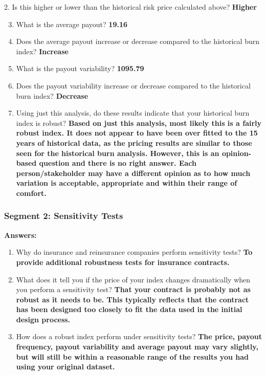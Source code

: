 \documentclass[letterpaper,10pt,english]{sphinxmanual}
\begin{document}
2. Is this higher or lower than the historical risk price calculated above?
\textbf{Higher}
\begin{enumerate}
\setcounter{enumi}{2}
\item {} 
What is the average payout? \textbf{19.16}

\item {} 
Does the average payout increase or decrease compared to the historical burn index? \textbf{Increase}

\item {} 
What is the payout variability? \textbf{1095.79}

\item {} 
Does the payout variability increase or decrease compared to the historical burn index? \textbf{Decrease}

\item {} 
Using just this analysis, do these results indicate that your historical burn index is robust? \textbf{Based on just this analysis, most likely this is a fairly robust index. It does not appear to have been over fitted to the 15 years of historical data, as the pricing results are similar to those seen for the historical burn analysis. However, this is an opinion-based question and there is no right answer. Each person/stakeholder may have a different opinion as to how much variation is acceptable, appropriate and within their range of comfort.}

\end{enumerate}


\subsubsection{Segment 2: Sensitivity Tests}
\label{wiiet/wiiet_initialtomarketpricinganskey:segment-2-sensitivity-tests}
\textbf{Answers:}
\begin{enumerate}
\item {} 
Why do insurance and reinsurance companies perform sensitivity tests? \textbf{To provide additional robustness tests for insurance contracts.}

\item {} 
What does it tell you if the price of your index changes dramatically when you perform a sensitivity test? \textbf{That your contract is probably not as robust as it needs to be.  This typically reflects that the contract has been designed too closely to fit the data used in the initial design process.}

\item {} 
How does a robust index perform under sensitivity tests? \textbf{The price, payout frequency, payout variability and average payout may vary slightly, but will still be within a reasonable range of the results you had using your original dataset.}

\end{enumerate}
\end{document}
